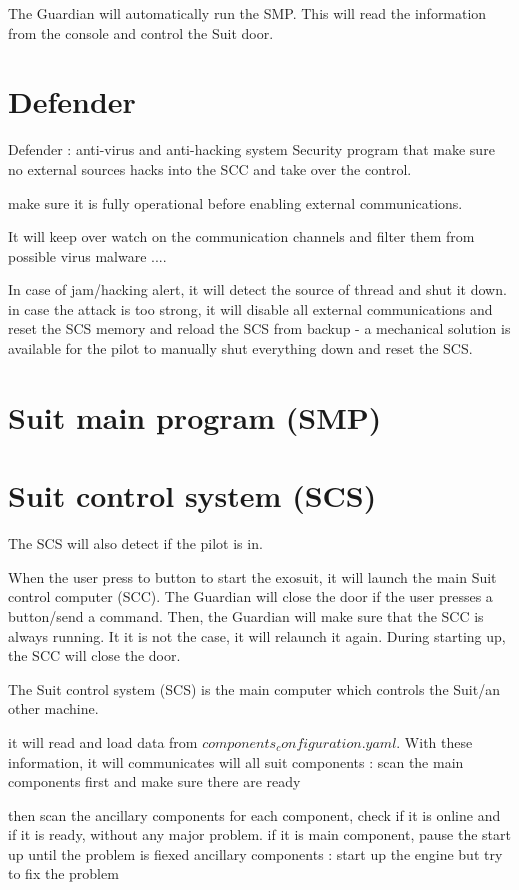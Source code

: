 \documentclass[12pt,a4paper]{article}
\begin{document}
The Guardian will automatically run the SMP. This will read the information from the console and control the Suit door. 

\section{Defender}

Defender : anti-virus and anti-hacking system
Security program that make sure no external sources hacks into the SCC and take over the control.

make sure it is fully operational before enabling external communications. 

It will keep over watch on the communication channels and filter them from possible virus malware ....

In case of jam/hacking alert, it will detect the source of thread and shut it down. 
in case the attack is too strong, it will disable all external communications and reset the SCS memory and reload the SCS from backup
- a mechanical solution is available for the pilot to manually shut everything down and reset the SCS. 

\section{Suit main program (SMP)}

\section{Suit control system (SCS)}

The SCS will also detect if the pilot is in. 

When the user press to button to start the exosuit, it will launch the main Suit control computer (SCC). 
The Guardian will close the door if the user presses a button/send a command.
Then, the Guardian will make sure that the SCC is always running. It it is not the case, it will relaunch it again. 
During starting up, the SCC will close the door. 


The Suit control system (SCS) is the main computer which controls the Suit/an other machine.

it will read  and load data from $components_configuration.yaml$.
With these information, it will communicates will all suit components : 
scan the main components first and make sure there are ready

then scan the ancillary components
for each component, check if it is online and if it is ready, without any major problem.
if it is main component, pause the start up until the problem is fiexed
ancillary components : start up the engine but try to fix the problem
\end{document}
